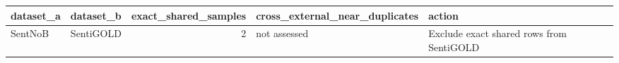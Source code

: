 \begin{tabular}{llrll}
\toprule
dataset\_a & dataset\_b & exact\_shared\_samples & cross\_external\_near\_duplicates & action \\
\midrule
SentNoB & SentiGOLD & 2 & not assessed & Exclude exact shared rows from SentiGOLD \\
\bottomrule
\end{tabular}
